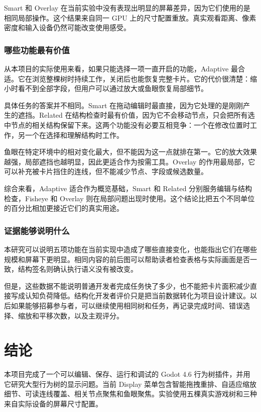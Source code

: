 \documentclass[11pt,a4paper,oneside,extrafontsizes]{memoir}
\begin{document}
Smart 和 Overlay 在当前实验中没有表现出明显的屏幕差异，因为它们使用的是相同局部操作。这个结果来自同一 GPU 上的尺寸配置重放。真实观看距离、像素密度和输入设备仍然可能改变使用感受。

\subsection{哪些功能最有价值}

从本项目的实际使用来看，如果只能选择一项一直开启的功能，Adaptive 最合适。它在浏览整棵树时持续工作，关闭后也能恢复完整卡片。它的代价很清楚：缩小时看不到全部字段，但用户可以通过放大或鱼眼恢复局部细节。

具体任务的答案并不相同。Smart 在拖动编辑时最直接，因为它处理的是刚刚产生的遮挡。Related 在结构检查时最有价值，因为它不会移动节点，只会把所有选中节点的相关结构保留下来。这两个功能没有必要互相竞争：一个在修改位置时工作，另一个在选择和理解结构时工作。

鱼眼在特定环境中的相对变化最大，但不能因为这一点就排在第一。它的放大效果越强，局部遮挡也越明显，因此更适合作为按需工具。Overlay 的作用最局部，它可以补充被卡片挡住的连线，但不能减少节点、字段或候选数量。

综合来看，Adaptive 适合作为概览基础，Smart 和 Related 分别服务编辑与结构检查，Fisheye 和 Overlay 则在局部问题出现时使用。这个结论比把五个不同单位的百分比相加更接近它们的真实用途。

\subsection{证据能够说明什么}

本研究可以说明五项功能在当前实现中造成了哪些直接变化，也能指出它们在哪些规模和屏幕下更明显。相同内容的前后图可以帮助读者检查表格与实际画面是否一致，结构签名则确认执行语义没有被改变。

但是，这些数据不能说明普通开发者完成任务快了多少，也不能把卡片面积减少直接写成认知负荷降低。结构化开发者评价只是把当前数据转化为项目设计建议。以后如果能够招募参与者，可以继续使用相同树和任务，再记录完成时间、错误选择、缩放和平移次数，以及主观评分。

\chapter{结论}

本项目完成了一个可以编辑、保存、运行和调试的 Godot 4.6 行为树插件，并用它研究大型行为树的显示问题。当前 Display 菜单包含智能拖拽重排、自适应缩放细节、可读连线覆盖、相关节点聚焦和鱼眼聚焦。实验使用五棵真实游戏树和三种来自实际设备的屏幕尺寸配置。
\end{document}
